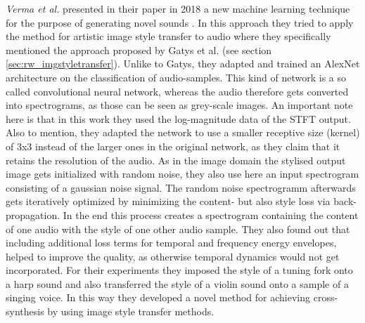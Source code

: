 \textit{Verma et al.} presented in their paper in 2018 a new machine learning technique for the purpose of generating novel sounds \cite{verma2018neural}. In this approach they tried to apply the method for artistic image style transfer to audio where they specifically mentioned the approach proposed by Gatys et al.\cite{Gatys2016} (see section \ref{sec:rw_imgstyletransfer}). Unlike to Gatys, they adapted and trained an AlexNet architecture on the classification of audio-samples. This kind of network is a so called convolutional neural network, whereas the audio therefore gets converted into spectrograms, as those can be seen as grey-scale images. An important note here is that in this work they used the log-magnitude data of the STFT output. Also to mention, they adapted the network to use a smaller receptive size (kernel) of 3x3 instead of the larger ones in the original network, as they claim that it retains the resolution of the audio. As in the image domain the stylised output image gets initialized with random noise, they also use here an input spectrogram consisting of a gaussian noise signal. The random noise spectrogramm afterwards gets iteratively optimized by minimizing the content- but also style loss via back-propagation. In the end this process creates a spectrogram containing the content of one audio with the style of one other audio sample. They also found out that including additional loss terms for temporal and frequency energy envelopes, helped to improve the quality, as otherwise temporal dynamics would not get incorporated. For their experiments they imposed the style of a tuning fork onto a harp sound and also transferred the style of a violin sound onto a sample of a singing voice. In this way they developed a novel method for achieving cross-synthesis by using image style transfer methods.\\

